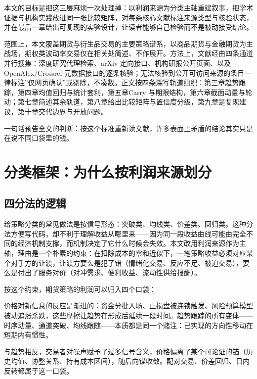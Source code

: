 \documentclass[12pt,a4paper]{ctexart}
\begin{document}
本文的目标是把这三层麻烦一次处理掉：以利润来源为分类主轴重建叙事，把学术证据与机构实践放进同一张比较矩阵，对每条核心文献标注来源类型与核验状态，并在最后一章给出可复现的实验设计，让读者能够自己检验而不是被动接受结论。


范围上，本文覆盖期货与衍生品交易的主要策略谱系，以商品期货与金融期货为主战场，期权类波动率交易仅在相关处简述、不作展开。方法上，文献经由四条通道并行搜集：深度研究代理检索、arXiv 定向接口、机构研报公开页面、以及OpenAlex/Crossref 元数据接口的逐条核验；无法核验到公开可访问来源的条目一律标注”\hspace{0.3em}仅网页确认”\hspace{0.3em}或剔除，不凑数。正文按四条深写轨道组织：第三章趋势跟踪，第四章均值回归与统计套利，第五章Carry 与期限结构，第六章截面动量与轮动；第七章简述其余轨道，第八章给出比较矩阵与置信度分级，第九章是复现建议，第十章交代边界与开放问题。


一句话预告全文的判断：按这个标准重新读文献，许多表面上矛盾的结论其实只是在说不同口袋里的钱。


\section{分类框架：为什么按利润来源划分}

\subsection{四分法的逻辑}

给策略分类的常见做法是按信号形态：突破类、均线类、价差类、回归类。这种分法方便写代码，却不利于理解收益从哪里来——因为同一段收益曲线可能由完全不同的经济机制支撑，而机制决定了它什么时候会失效。本文改用利润来源作为主轴，理由是一个朴素的约束：在扣除成本的零和近似下，一笔策略收益必须对应某个对手方的让渡，让渡方要么是犯了错（情绪化交易、反应不足、被迫交易），要么是付出了服务对价（对冲需求、便利收益、流动性供给报酬）。


按这个约束，期货策略的利润可以归入四个口袋：


价格对新信息的反应是渐进的：资金分批入场、止损盘被连锁触发、风险预算模型被动追涨杀跌，这些摩擦让趋势在形成后延续一段时间。趋势跟踪的所有变体——时序动量、通道突破、均线跟随——本质都是同一个赌注：已实现的方向性移动在短期内有惯性。


与趋势相反，交易者对噪声赋予了过多信号含义，价格偏离了某个可论证的锚（历史均值、协整关系、持有成本区间），随后向锚收敛。配对交易、价差回归、日内反转都属于这一口袋。
\end{document}

